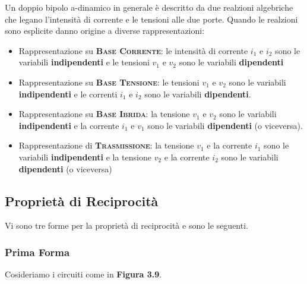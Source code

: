 \documentclass[a4paper]{report}
\begin{document}
Un doppio bipolo a-dinamico in generale \`e descritto da due realzioni
algebriche che legano l'intensit\`a di corrente e le tensioni alle due
porte. Quando le realzioni sono esplicite danno origine a diverse
rappresentazioni:

\begin{itemize}
  \item Rappresentazione su {\textsc{\bf Base Corrente}}: le
    intensit\`a di corrente $i_1$ e $i_2$ sono le variabili {\bf
      indipendenti} e le tensioni $v_1$ e $v_2$ sono le variabili {\bf
    dipendenti}
  \item Rappresentazione su {\textsc{\bf Base Tensione}}: le tensioni
    $v_1$ e $v_2$ sono le variabili {\bf indipendenti} e le correnti
    $i_1$ e $i_2$ sono le variabili {\bf dipendenti}.
  \item Rappresentazione su {\textsc{\bf Base Ibrida}}: la tensione
    $v_1$ e $v_2$ sono le variabili {\bf indipendenti} e la corrente
    $i_1$ e $v_1$ sono le variabili {\bf dipendenti} (o viceversa).
  \item Rappresentazione di {\textsc{\bf Trasmissione}}: la tensione
    $v_1$ e la corrente $i_1$ sono le variabili {\bf indipendenti} e
    la tensione $v_2$ e la corrente $i_2$ sono le variabili {\bf
      dipendenti} (o viceversa)
\end{itemize}

\subsection{Propriet\`a di Reciprocit\`a}

Vi sono tre forme per la propriet\`a di reciprocit\`a e sono le
seguenti.

\subsubsection{Prima Forma}

Cosideriamo i circuiti come in {\bf Figura 3.9}.
\end{document}
